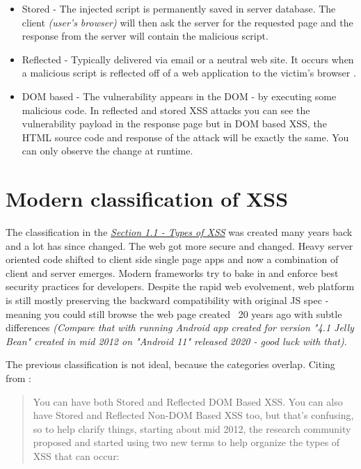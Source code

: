 \begin{itemize}
  \item  Stored - The injected script is permanently saved in server database. The client
        \emph{(user's browser)} will then ask the server for the requested page and the response
        from the server will contain the malicious script.
  \item  Reflected - Typically delivered via email or a neutral web site. It occurs when a malicious
        script is reflected off of a web application to the victim’s browser \cite{reflected_xss}.
  \item  DOM based - The vulnerability appears in the DOM - by executing some malicious code. In
        reflected and stored XSS attacks you can see the vulnerability payload in the response page
        but in DOM based XSS, the HTML source code and response of the attack will be exactly the
        same. You can only observe the change at runtime.
\end{itemize}

\section{Modern classification of XSS}

The classification in the \emph{\hyperref[chapter:xss:types]{Section 1.1 - Types of XSS}} was
created many years back and a lot has since changed. The web got more secure and changed. Heavy
server oriented code shifted to client side single page apps and now a combination of client and
server emerges. Modern frameworks try to bake in and enforce best security practices for developers.
Despite the rapid web evolvement, web platform is still mostly preserving the backward compatibility
with original JS spec - meaning you could still browse the web page created ~20 years ago with
subtle differences \emph{(Compare that with running Android app created for version "4.1 Jelly Bean"
  created in mid 2012 on "Android 11" released 2020 - good luck with that)}.

The previous classification is not ideal, because the categories overlap. Citing from
\cite{xss_owasp_types}:
\begin{quotation}
  You can have both Stored and Reflected DOM Based XSS. You can also have Stored and Reflected
  Non-DOM Based XSS too, but that’s confusing, so to help clarify things, starting about mid 2012,
  the research community proposed and started using two new terms to help organize the types of XSS
  that can occur:
\end{quotation}

